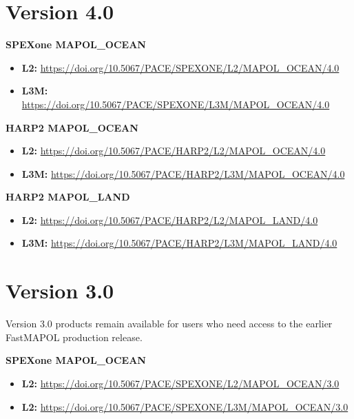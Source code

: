 \documentclass[
  11pt,
  letterpaper,
]{scrreprt}
\providecommand{\tightlist}{%
  \setlength{\itemsep}{0pt}\setlength{\parskip}{0pt}}
\begin{document}
\section*{Version 4.0}\label{version-4.0}


\textbf{SPEXone MAPOL\_OCEAN}

\begin{itemize}
\tightlist
\item
  \textbf{L2:}
  \url{https://doi.org/10.5067/PACE/SPEXONE/L2/MAPOL_OCEAN/4.0}
\item
  \textbf{L3M:}
  \url{https://doi.org/10.5067/PACE/SPEXONE/L3M/MAPOL_OCEAN/4.0}
\end{itemize}

\textbf{HARP2 MAPOL\_OCEAN}

\begin{itemize}
\tightlist
\item
  \textbf{L2:}
  \url{https://doi.org/10.5067/PACE/HARP2/L2/MAPOL_OCEAN/4.0}
\item
  \textbf{L3M:}
  \url{https://doi.org/10.5067/PACE/HARP2/L3M/MAPOL_OCEAN/4.0}
\end{itemize}

\textbf{HARP2 MAPOL\_LAND}

\begin{itemize}
\tightlist
\item
  \textbf{L2:}
  \url{https://doi.org/10.5067/PACE/HARP2/L2/MAPOL_LAND/4.0}
\item
  \textbf{L3M:}
  \url{https://doi.org/10.5067/PACE/HARP2/L3M/MAPOL_LAND/4.0}
\end{itemize}

\section*{Version 3.0}\label{version-3.0}


Version 3.0 products remain available for users who need access to the
earlier FastMAPOL production release.

\textbf{SPEXone MAPOL\_OCEAN}

\begin{itemize}
\tightlist
\item
  \textbf{L2:}
  \url{https://doi.org/10.5067/PACE/SPEXONE/L2/MAPOL_OCEAN/3.0}
\item
  \textbf{L2:}
  \url{https://doi.org/10.5067/PACE/SPEXONE/L3M/MAPOL_OCEAN/3.0}
\end{itemize}
\end{document}
